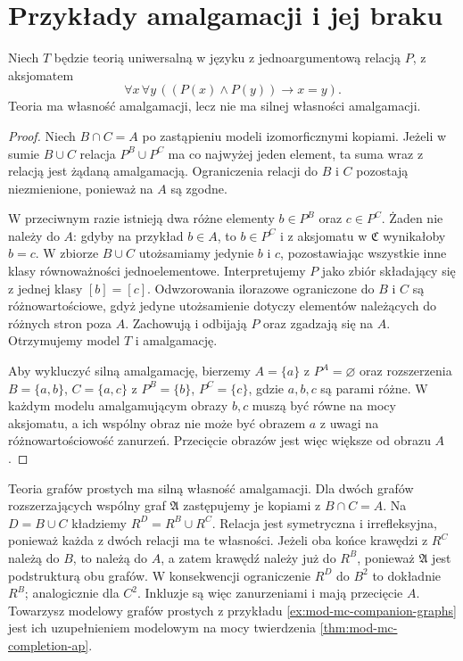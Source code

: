 \section{Przykłady amalgamacji i jej braku}
\begin{przyklad}
\label{ex:mod-mc-ap-not-strong}
Niech $T$ będzie teorią uniwersalną w języku
z jednoargumentową relacją $P$, z aksjomatem
\[
\forall x\,\forall y\,((P(x)\land P(y))\to x=y).
\]
Teoria ma własność amalgamacji, lecz nie ma
silnej własności amalgamacji.
\end{przyklad}
\begin{proof}
Niech $B\cap C=A$ po zastąpieniu modeli
izomorficznymi kopiami. Jeżeli w sumie $B\cup C$
relacja $P^B\cup P^C$ ma co najwyżej jeden element,
ta suma wraz z relacją jest żądaną amalgamacją.
Ograniczenia relacji do $B$ i $C$ pozostają
niezmienione, ponieważ na $A$ są zgodne.

W przeciwnym razie istnieją dwa różne elementy
$b\in P^B$ oraz $c\in P^C$. Żaden nie należy do $A$:
gdyby na przykład $b\in A$, to $b\in P^C$ i z aksjomatu
w $\mathfrak C$ wynikałoby $b=c$.
W zbiorze $B\cup C$ utożsamiamy jedynie $b$ i $c$,
pozostawiając wszystkie inne klasy równoważności
jednoelementowe. Interpretujemy $P$ jako zbiór
składający się z jednej klasy $[b]=[c]$.
Odwzorowania ilorazowe ograniczone do $B$ i $C$
są różnowartościowe, gdyż jedyne utożsamienie
dotyczy elementów należących do różnych stron
poza $A$. Zachowują i odbijają $P$ oraz zgadzają się
na $A$. Otrzymujemy model $T$ i amalgamację.

Aby wykluczyć silną amalgamację, bierzemy
$A=\{a\}$ z $P^A=\varnothing$ oraz rozszerzenia
$B=\{a,b\}$, $C=\{a,c\}$ z $P^B=\{b\}$,
$P^C=\{c\}$, gdzie $a,b,c$ są parami różne.
W każdym modelu amalgamującym obrazy $b,c$
muszą być równe na mocy aksjomatu, a ich wspólny
obraz nie może być obrazem $a$ z uwagi na
różnowartościowość zanurzeń. Przecięcie obrazów
jest więc większe od obrazu $A$.
\end{proof}

\begin{przyklad}
\label{ex:mod-mc-graphs-ap}
Teoria grafów prostych ma silną własność amalgamacji.
Dla dwóch grafów rozszerzających wspólny graf
$\mathfrak A$ zastępujemy je kopiami z $B\cap C=A$.
Na $D=B\cup C$ kładziemy $R^D=R^B\cup R^C$.
Relacja jest symetryczna i irrefleksyjna, ponieważ
każda z dwóch relacji ma te własności.
Jeżeli oba końce krawędzi z $R^C$ należą do $B$,
to należą do $A$, a zatem krawędź należy już
do $R^B$, ponieważ $\mathfrak A$ jest podstrukturą
obu grafów. W konsekwencji ograniczenie $R^D$
do $B^2$ to dokładnie $R^B$; analogicznie dla $C^2$.
Inkluzje są więc zanurzeniami i mają przecięcie $A$.
Towarzysz modelowy grafów prostych z przykładu
\ref{ex:mod-mc-companion-graphs} jest ich uzupełnieniem
modelowym na mocy twierdzenia
\ref{thm:mod-mc-completion-ap}.
\end{przyklad}

